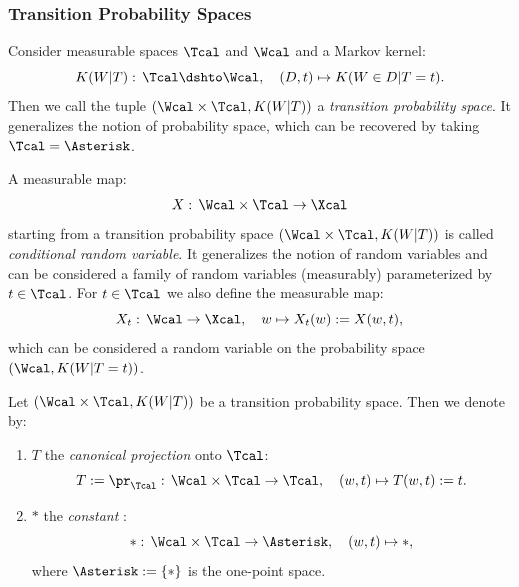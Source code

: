 \subsubsection{Transition Probability Spaces}

\begin{Def}
    Consider measurable spaces $\Tcal$ and $\Wcal$ and a Markov kernel:
    \[K(W|T):\, \Tcal \dshto \Wcal,\quad (D,t) \mapsto K(W \in D|T=t).  \]
    Then we call the tuple 
    $(\Wcal \times \Tcal, K(W|T))$ a \emph{transition probability space}.
    It generalizes the notion of probability space, which can be recovered by taking $\Tcal=\Asterisk$.
\end{Def}




\begin{Def}
    A measurable map:
    \[ X:\, \Wcal \times \Tcal \to \Xcal  \]
    starting from a transition probability space $(\Wcal\times \Tcal, K(W|T))$ is called
    \emph{conditional random variable}.
    It generalizes the notion of random variables and can be considered a family of random variables (measurably) parameterized by $t \in \Tcal$.
    For $t \in \Tcal$ we also define the measurable map:
    \[ X_t:\, \Wcal \to \Xcal,\quad w \mapsto X_t(w):= X(w,t),\]
    which can be considered a random variable on the probability space $(\Wcal,K(W|T=t))$.
\end{Def}


\begin{Eg}
        Let $(\Wcal\times \Tcal, K(W|T))$ be a transition probability space.
        Then we denote by:
        \begin{enumerate}
            \item $T$ the \emph{canonical projection} onto $\Tcal$:
                \[T:= \pr_\Tcal:\,\Wcal \times \Tcal \to \Tcal,\quad (w,t) \mapsto T(w,t):= t.\]
            \item $\ast$ the \emph{constant \trv{}}:
                \[ \ast :\,\Wcal \times \Tcal \to \Asterisk,\quad (w,t) \mapsto \ast,\]
                where $\Asterisk:=\{\ast\}$ is the one-point space.
        \end{enumerate}
\end{Eg}




